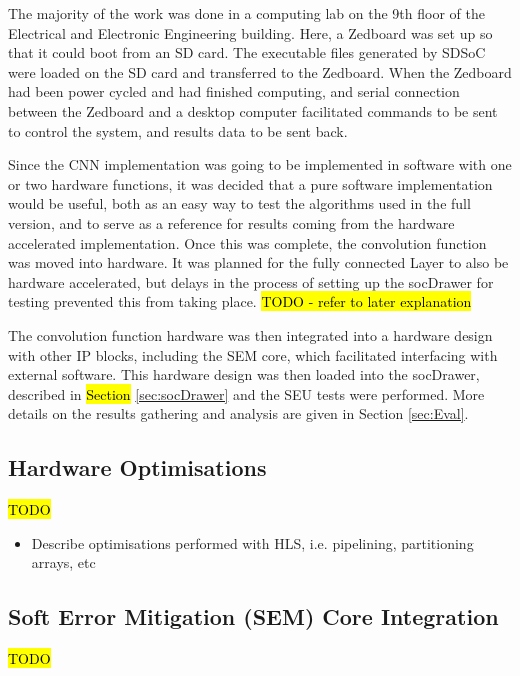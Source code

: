 \documentclass[12pt]{article}
\begin{document}
The majority of the work was done in a computing lab on the 9th floor of the Electrical and Electronic Engineering building. Here, a Zedboard was set up so that it could boot from an SD card. The executable files generated by SDSoC were loaded on the SD card and transferred to the Zedboard. When the Zedboard had been power cycled and had finished computing, and serial connection between the Zedboard and a desktop computer facilitated commands to be sent to control the system, and results data to be sent back.

Since the CNN implementation was going to be implemented in software with one or two hardware functions, it was decided that a pure software implementation would be useful, both as an easy way to test the algorithms used in the full version, and to serve as a reference for results coming from the hardware accelerated implementation. Once this was complete, the convolution function was moved into hardware. It was planned for the fully connected Layer to also be hardware accelerated, but delays in the process of setting up the socDrawer for testing prevented this from taking place. \hl{TODO - refer to later explanation}

The convolution function hardware was then integrated into a hardware design with other IP blocks, including the SEM core, which facilitated interfacing with external software. This hardware design was then loaded into the socDrawer, described in \hl{Section} \ref{sec:socDrawer} and the SEU tests were performed. More details on the results gathering and analysis are given in Section \ref{sec:Eval}.

\subsection{Hardware Optimisations}
\label{sec:Imp-Optimisations}


\hl{TODO}

\begin{itemize}
\item Describe optimisations performed with HLS, i.e. pipelining, partitioning arrays, etc

\end{itemize}

\subsection{Soft Error Mitigation (SEM) Core Integration}
\label{sec:Imp-SEM}

\hl{TODO}
\end{document}
